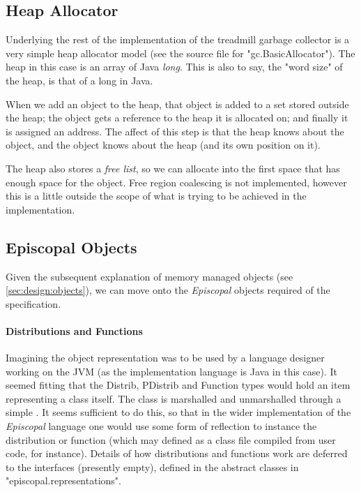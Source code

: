\documentclass[]{article}
\begin{document}
\subsection{Heap Allocator}\label{sec:design:heap}
Underlying the rest of the implementation of the treadmill garbage collector is a very simple heap allocator model (see the source file for "gc.BasicAllocator"). The heap in this case is an array of Java \emph{long}. This is also to say, the "word size" of the heap, is that of a long in Java.

When we add an object to the heap, that object is added to a set stored outside the heap; the object gets a reference to the heap it is allocated on; and finally it is assigned an address. The affect of this step is that the heap knows about the object, and the object knows about the heap (and its own position on it).

The heap also stores a \emph{free list}, so we can allocate into the first space that has enough space for the object. Free region coalescing is not implemented, however this is a little outside the scope of what is trying to be achieved in the implementation.

\subsection{Episcopal Objects}\label{sec:design:episcopal}
Given the subsequent explanation of memory managed objects (see \ref{sec:design:objects}), we can move onto the \emph{Episcopal} objects required of the specification.

\paragraph{Distributions and Functions}
Imagining the object representation was to be used by a language designer working on the JVM (as the implementation language is Java in this case). It seemed fitting that the Distrib, PDistrib and Function types would hold an item representing a class itself. The class is marshalled and unmarshalled through a simple . It seems sufficient to do this, so that in the wider implementation of the \emph{Episcopal} language one would use some form of reflection to instance the distribution or function (which may defined as a class file compiled from user code, for instance). Details of how distributions and functions work are deferred to the interfaces (presently empty), defined in the abstract classes in "episcopal.representations".
\end{document}
